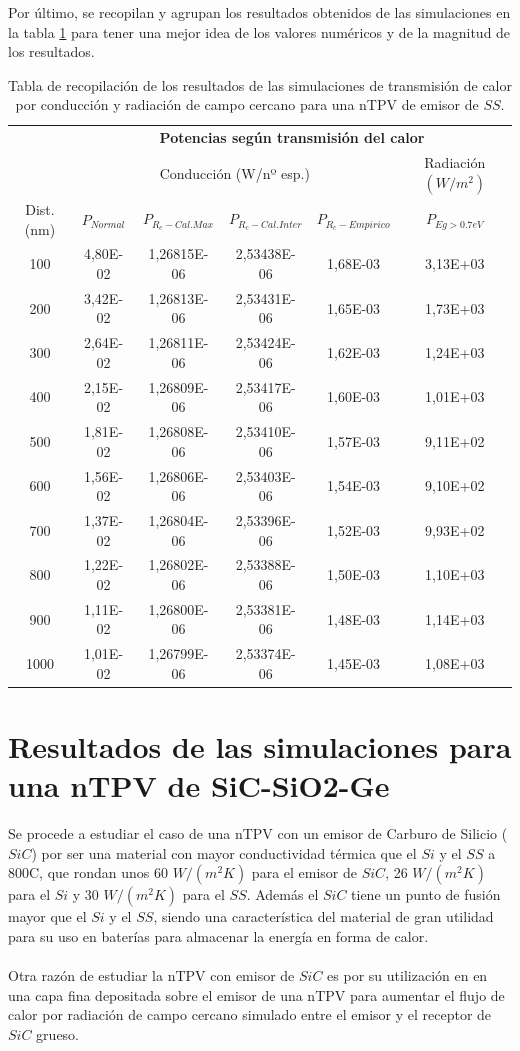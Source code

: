Por último, se recopilan y agrupan los resultados obtenidos de las simulaciones en la tabla \ref{tab:SsSiO2Ge} para tener una mejor idea de los valores numéricos y de la magnitud de los resultados.
\begin{table}[H]
	\centering
		\begin{tabular}{|c||c|c|c|c||c|}
		\hline
		\multirow{2}{*}{ }& \multicolumn{5}{c|}{\textbf{\large Potencias según transmisión del calor}}\\ \cline{2-6}
& \multicolumn{4}{c||}{Conducción (W/nº esp.)}& Radiación $(W/m^2)$\\ \hline
Dist. (nm)&$P_{Normal}$&$P_{R_c-Cal.Max}$&$P_{R_c-Cal.Inter}$&$P_{R_c-Empirico}$&$P_{Eg>0.7eV}$\\ \hline \hline
100&4,80E-02&1,26815E-06&2,53438E-06&1,68E-03&3,13E+03\\ \hline 
200&3,42E-02&1,26813E-06&2,53431E-06&1,65E-03&1,73E+03\\ \hline 
300&2,64E-02&1,26811E-06&2,53424E-06&1,62E-03&1,24E+03\\ \hline 
400&2,15E-02&1,26809E-06&2,53417E-06&1,60E-03&1,01E+03\\ \hline 
500&1,81E-02&1,26808E-06&2,53410E-06&1,57E-03&9,11E+02\\ \hline 
600&1,56E-02&1,26806E-06&2,53403E-06&1,54E-03&9,10E+02\\ \hline 
700&1,37E-02&1,26804E-06&2,53396E-06&1,52E-03&9,93E+02\\ \hline 
800&1,22E-02&1,26802E-06&2,53388E-06&1,50E-03&1,10E+03\\ \hline 
900&1,11E-02&1,26800E-06&2,53381E-06&1,48E-03&1,14E+03\\ \hline 
1000&1,01E-02&1,26799E-06&2,53374E-06&1,45E-03&1,08E+03\\ \hline 
		\end{tabular}
	\caption{Tabla de recopilación de los resultados de las simulaciones de transmisión de calor por conducción y radiación de campo cercano para una nTPV de emisor de $SS$.}
	\label{tab:SsSiO2Ge}
\end{table}
\vfill \newpage
\section{Resultados de las simulaciones para una nTPV de SiC-SiO2-Ge}\label{sec:res_SiCSiO2Ge}
Se procede a estudiar el caso de una nTPV con un emisor de Carburo de Silicio ($SiC$) por ser una material con mayor conductividad térmica que el $Si$ y el $SS$ a 800\textdegree C, que rondan unos 60 $W/(m^2 K)$ para el emisor de $SiC$, 26 $W/(m^2 K)$ para el $Si$ y 30 $W/(m^2 K)$ para el $SS$. Además el $SiC$ tiene un punto de fusión mayor que el $Si$ y el $SS$, siendo una característica del material de gran utilidad para su uso en baterías para almacenar la energía en forma de calor.\\\\
Otra razón de estudiar la nTPV con emisor de $SiC$ es por su utilización en \cite{doi:Near_field_ThinFilm} en una capa fina depositada sobre el emisor de una nTPV para aumentar el flujo de calor por radiación de campo cercano simulado entre el emisor y el receptor de $SiC$ grueso.
